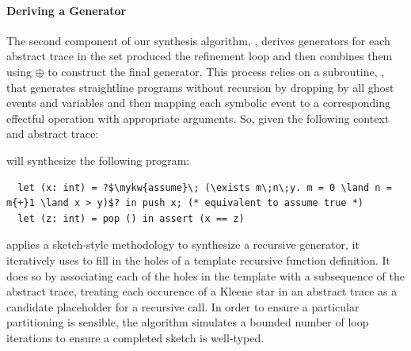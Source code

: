 \paragraph{Deriving a Generator}
The second component of our synthesis algorithm, \derive{}, derives
generators for each abstract trace in the set produced the refinement
loop and then combines them using $\oplus$ to construct the final
generator.  This process relies on a subroutine, \deriveTrace{}, that
generates straightline programs without recursion by dropping by all
ghost events and variables and then mapping each symbolic event to a
corresponding effectful operation with appropriate arguments. So,
given the following context and abstract trace:
\vspace{-.4cm} \par{}\noindent \deriveTrace{} will synthesize the following program:
\begin{verbatim}
  let (x: int) = ?$\mykw{assume}\; (\exists m\;n\;y. m = 0 \land n = m{+}1 \land x > y)$? in push x; (* equivalent to assume true *)
  let (z: int) = pop () in assert (x == z)
\end{verbatim}
\derive{} applies a sketch-style methodology to synthesize a recursive
generator, it iteratively uses \deriveTrace{} to fill in the holes of a template recursive function definition. It does so by associating each of the
holes in the template with a subsequence of the abstract trace,
treating each occurence of a Kleene star in an abstract trace as a
candidate placeholder for a recursive call. In order to ensure a
particular partitioning is sensible, the algorithm simulates a bounded
number of loop iterations to ensure a completed sketch is well-typed.


